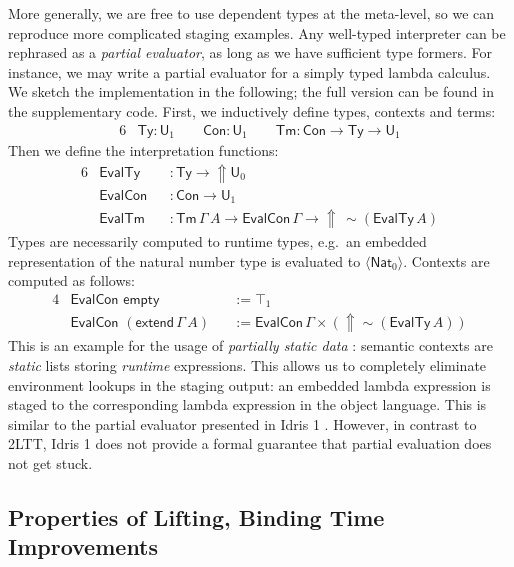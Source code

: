 \documentclass[acmsmall,screen]{acmart}
\newcommand{\msf}[1]{\mathsf{#1}}
\newcommand{\Lift}{{\Uparrow}}
\newcommand{\spl}{{\sim}}
\newcommand{\qut}[1]{\langle #1\rangle}
\newcommand{\U}{\msf{U}}
\newcommand{\Con}{\msf{Con}}
\newcommand{\Ty}{\msf{Ty}}
\newcommand{\Tm}{\msf{Tm}}
\newcommand{\Nat}{\msf{Nat}}
\theoremstyle{remark}
\begin{document}
More generally, we are free to use dependent types at the meta-level, so we can
reproduce more complicated staging examples. Any well-typed interpreter can be
rephrased as a \emph{partial evaluator}, as long as we have sufficient type
formers. For instance, we may write a partial evaluator for a simply typed
lambda calculus. We sketch the implementation in the following; the full version
can be found in the supplementary code. First, we inductively define types,
contexts and terms:
\begin{alignat*}{6}
  & \Ty : \U_1  \hspace{2em} \Con : \U_1 \hspace{2em} \Tm : \Con \to \Ty \to \U_1
\end{alignat*}
Then we define the interpretation functions:
\begin{alignat*}{6}
  & \msf{EvalTy}  &&: \Ty \to \Lift \U_0 \\
  & \msf{EvalCon} &&: \Con \to \U_1 \\
  & \msf{EvalTm}  &&: \Tm\,\Gamma\,A \to \msf{EvalCon}\,\Gamma \to \Lift\,\spl(\msf{EvalTy}\,A)
\end{alignat*}
Types are necessarily computed to runtime types, e.g.\ an embedded
representation of the natural number type is evaluated to $\qut{\Nat_0}$.
Contexts are computed as follows:
\begin{alignat*}{4}
  &\msf{EvalCon}\,\,\msf{empty}                &&:= \top_1 \\
  &\msf{EvalCon}\,\,(\msf{extend}\,\Gamma\,A) &&:= \msf{EvalCon}\,\Gamma \times (\Lift \spl(\msf{EvalTy}\,A))
\end{alignat*}
This is an example for the usage of \emph{partially static data} \cite{partial-evaluation}:
semantic contexts are \emph{static} lists storing \emph{runtime}
expressions. This allows us to completely eliminate environment lookups in the
staging output: an embedded lambda expression is staged to the corresponding
lambda expression in the object language. This is similar to the partial
evaluator presented in Idris 1 \cite{scrap-your-inefficient-engine}. However, in
contrast to 2LTT, Idris 1 does not provide a formal guarantee that partial
evaluation does not get stuck.

\subsection{Properties of Lifting, Binding Time Improvements}
\end{document}
